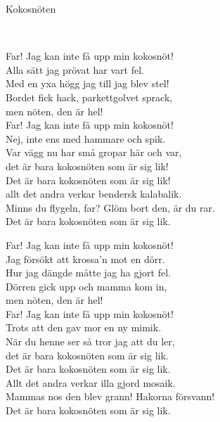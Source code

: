 \begin{song}{Kokosnöten}
	
	
	\\
	

    \showversenumber	
	Far! Jag kan inte få upp min kokosnöt!\\
	Alla sätt jag prövat har vart fel.\\
	Med en yxa högg jag till jag blev stel!\\
	Bordet fick hack, parkettgolvet sprack,\\
	men nöten, den är hel!\\
	Far! Jag kan inte få upp min kokosnöt!\\
	Nej, inte ens med hammare och spik.\\
	Var vägg nu har små gropar här och var,\\
	det är bara kokosnöten som är sig lik!\\
	Det är bara kokosnöten som är sig lik!\\
	allt det andra verkar bendersk kalabalik.\\
	Minns du flygeln, far? Glöm bort den, är du rar.\\
	Det är bara kokosnöten som är sig lik.
	
    \showversenumber
	Far! Jag kan inte få upp min kokosnöt!\\
	Jag försökt att krossa'n mot en dörr.\\
	Hur jag dängde måtte jag ha gjort fel.\\
	Dörren gick upp och mamma kom in,\\
	men nöten, den är hel!\\
	Far! Jag kan inte få upp min kokosnöt!\\
	Trots att den gav mor en ny mimik.\\
	När du henne ser så tror jag att du ler,\\
	det är bara kokosnöten som är sig lik.\\
	Det är bara kokosnöten som är sig lik.\\
	Allt det andra verkar illa gjord mosaik.\\
	Mammas nos den blev grann! Hakorna försvann!\\
	Det är bara kokosnöten som är sig lik.
	

\end{song}
